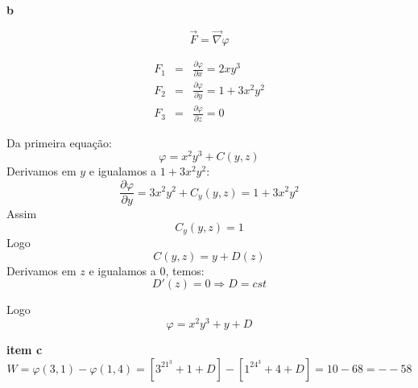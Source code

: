 \documentclass[a4paper,10pt]{book}
\begin{document}
{\bf b}

$$\vec{F}=\vec{\nabla}\varphi$$

\begin{eqnarray*}
 F_1 &=& \frac{\partial \varphi}{\partial x}=2xy^3\\
 F_2 &=& \frac{\partial \varphi}{\partial y}=1+3x^2y^2\\
 F_3 &=& \frac{\partial \varphi}{\partial z}=0
\end{eqnarray*}

Da primeira equação:
$$\varphi=x^2y^3+C(y,z)$$
Derivamos em $y$ e igualamos a $1+3x^2y^2$:
$$\frac{\partial \varphi}{\partial y}=3x^2y^2+C_y(y,z)=1+3x^2y^2$$
Assim
$$C_y(y,z)=1$$
Logo
$$C(y,z)=y+D(z)$$
Derivamos em $z$ e igualamos a $0$, temos:
$$D'(z)=0\Longrightarrow D=cst$$

Logo
$$\varphi=x^2y^3+y+D $$

{\bf item c}
$$W=\varphi(3,1)-\varphi(1,4)=\left[3^21^3+1+D\right]-\left[1^24^3+4+D\right]=10-68=--58$$
\end{document}
